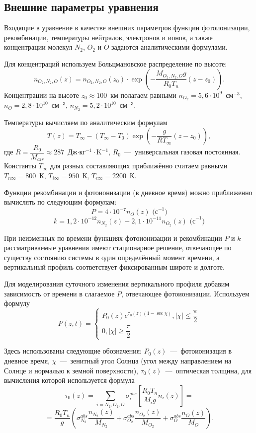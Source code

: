 \documentclass[14pt, a4paper, fleqn]{extarticle}
\renewcommand{\leq}{\leqslant}
\renewcommand{\geq}{\geqslant}
\begin{document}
\subsection{Внешние параметры уравнения}

Входящие в уравнение в качестве внешних параметров функции фотоионизации, рекомбинации, температуры нейтралов, электронов и ионов, а также концентрации молекул $N_2$, $O_2$ и $O$ задаются аналитическими формулами. 

Для концентраций используем Больцмановское распределение по высоте: $$n_{O_2, N_2, O} (z)= n_{O_2, N_2, O} (z_0)\cdot \exp\left(-\dfrac{M_{O_2, N_2, O}g}{R_0T_n}(z-z_0)\right).$$ Концентрации на высоте $z_0\approx 100$~км полагаем равными $n_{O_2} = 5{,}6\cdot 10^9$~см$^{-3}$, $n_{O} = 2{,}8\cdot 10^{10}$~см$^{-3}$, $n_{N_2} = 5{,}2\cdot 10^{10}$~см$^{-3}$. 

Температуры вычисляем по аналитическим формулам $$T(z)=T_\infty - (T_\infty-T_0)\exp\left(-\dfrac{g}{RT_\infty}(z-z_0)\right),$$ где $R=\dfrac{R_0}{M_{air}}\approx 287$~Дж$\cdot$кг$^{-1}\cdot$K$^{-1}$, $R_0$~---~универсальная газовая постоянная. Константы $T_\infty$ для разных составляющих приближённо считаем равными $T_{n\infty}=800$~К, $T_{i\infty}=950$~К, $T_{e\infty}=2200$~К.

Функции рекомбинации и фотоионизации (в дневное время) можно приближенно вычислять по следующим формулам: $$P=4\cdot10^{-7}n_O(z)\textrm{ (с}^{-1}\textrm{)}$$ $$k=1{,}2\cdot10^{-12}n_{N_2}(z)+2{,}1\cdot10^{-11}n_{O_2}(z) \textrm{ (с}^{-1}\textrm{)}$$

При неизменных по времени функциях фотоионизации и рекомбинации $P$ и $k$ рассматриваемые уравнения имеют стационарное решение, отвечающее по существу состоянию системы в один определённый момент времени, а вертикальный профиль соответствует фиксированным широте и долготе. 

Для моделирования суточного изменения вертикального профиля добавим зависимость от времени в слагаемое $P$, отвечающее фотоионизации. Используем формулу $$P(z, t) =\begin{cases}
P_0(z)e^{\tau_0(z)(1-\sec\chi)}, |\chi|\leq\dfrac{\pi}{2}\\
0, |\chi|\geq\dfrac{\pi}{2}
\end{cases}$$

Здесь использованы следующие обозначения: $P_0(z)$~---~фотоионизация в дневное время, $\chi$~---~зенитный угол Солнца (угол между направлением на Солнце и нормалью к земной поверхности), $\tau_0(z)$~---~оптическая толщина, для вычисления которой используется формула $$\tau_0(z)=\sum_{i = N_2, O_2, O} \sigma_i^{abs}\left[\dfrac{R_0T_n}{M_i g}n_i(z)\right]=$$ $$=\dfrac{R_0T_n}{g}\left(\sigma_{N_2}^{abs}\dfrac{n_{N_2}(z)}{M_{N_2}}+\sigma_{O_2}^{abs}\dfrac{n_{O_2}(z)}{M_{O_2}}+\sigma_{O}^{abs}\dfrac{n_{O}(z)}{M_{O}}\right).$$
\end{document}
